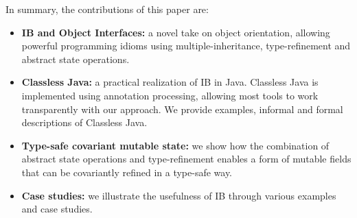 In summary, the contributions of this paper are:
\begin{itemize}

\item {\bf IB and Object Interfaces:} a novel take on object orientation, allowing
  powerful programming idioms using multiple-inheritance, 
  type-refinement and abstract state operations.

\item {\bf Classless Java:} a practical realization of IB in
  Java. Classless Java is implemented using annotation processing, 
  allowing most tools to work transparently with our approach. 
  We provide examples, informal and formal descriptions of Classless
  Java.

\item {\bf Type-safe covariant mutable state:} we show how the 
 combination of abstract state operations and type-refinement enables 
 a form of mutable fields that can be covariantly refined in a type-safe way.


\item {\bf Case studies:} we illustrate the usefulness of IB
  through various examples and case studies.


\end{itemize}
